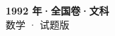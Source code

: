 \documentclass[zihao=-4, a4paper]{ctexart}
\begin{document}
\begin{center}
  {\Large\bfseries 1992 年·全国卷·文科}\\[4pt]
  {\large 数学 · 试题版}
\end{center}
\medskip
{}

\end{document}
